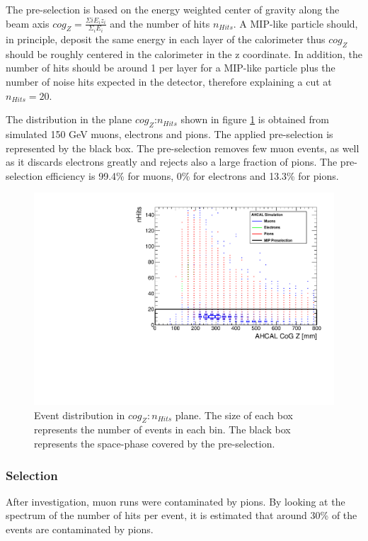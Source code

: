 The pre-selection is based on the energy weighted center of gravity along the beam axis $cog_Z = \frac{\Sigma{i} E_i z_i}{\Sigma_{i} E_i}$ and the number of hits $n_{Hits}$. A MIP-like particle should, in principle, deposit the same energy in each layer of the calorimeter thus $cog_Z$ should be roughly centered in the calorimeter in the z coordinate. In addition, the number of hits should be around 1 per layer for a MIP-like particle plus the number of noise hits expected in the detector, therefore explaining a cut at $n_{Hits} = 20$.

The distribution in the plane $cog_Z$:$n_{Hits}$ shown in figure \ref{fig:Muons_CoGZ_nHits} is obtained from simulated 150 GeV muons, electrons and pions. The applied pre-selection is represented by the black box. The pre-selection removes few muon events, as well as it discards electrons greatly and rejects also a large fraction of pions. The pre-selection efficiency is 99.4\% for muons, 0\% for electrons and 13.3\% for pions.

\begin{figure}[htbp!]
	\centering
	\includegraphics[width=0.7\linewidth]{../Thesis_Plots/Timing/Muons/Plots/SelectionCut_nHitsCoGZ_Muons}
	\caption{Event distribution in $cog_Z:n_{Hits}$ plane. The size of each box represents the number of events in each bin. The black box represents the space-phase covered by the pre-selection.} \label{fig:Muons_CoGZ_nHits}
\end{figure}

\subsubsection{Selection}
\label{subsec:Muon_sel}

After investigation, muon runs were contaminated by pions. By looking at the spectrum of the number of hits per event, it is estimated that around 30\% of the events are contaminated by pions.


